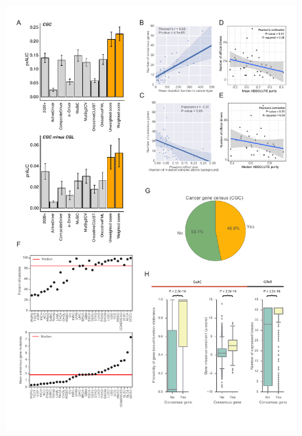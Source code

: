 \begin{figure}
  \centering
  \makeatletter
  \let\@currsize\normalsize
  \includegraphics[width=\linewidth]{figures/chapter7/analysis_of_cancer_driver_genes.pdf}

\end{figure}
